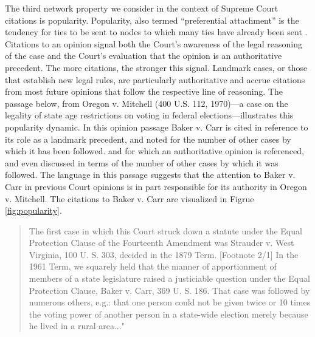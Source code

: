 \documentclass[headsepline=true, abstracton]{scrartcl}
\begin{document}
The third network property we consider in the context of Supreme Court citations is popularity. Popularity, also termed ``preferential attachment'' is the tendency for ties to be sent to nodes to which many ties have already been sent \citep{barabasi1999emergence}. Citations to an opinion signal both the Court's awareness of the legal reasoning of the case and the Court's evaluation that the opinion is an authoritative precedent. The more citations, the stronger this signal. Landmark cases, or those that establish new legal rules, are particularly authoritative and accrue citations from most future opinions that follow the respective line of reasoning. The passage below, from Oregon v. Mitchell (400 U.S. 112, 1970)---a case on the legality of state age restrictions on voting in federal elections---illustrates this popularity dynamic. In this opinion passage Baker v. Carr is cited in reference to its role as a landmark precedent, and noted for the number of other cases by which it has been followed. and for which an authoritative opinion is referenced, and even discussed in terms of the number of other cases by which it was followed. The language in this passage suggests that the attention to Baker v. Carr in previous Court opinions is in part responsible for its authority in Oregon v. Mitchell. The citations to Baker v. Carr are visualized in Figrue \ref{fig:popularity}.
\begin{quotation}
The first case in which this Court struck down a statute under the Equal Protection Clause of the Fourteenth Amendment was Strauder v. West Virginia, 100 U. S. 303, decided in the 1879 Term. [Footnote 2/1] In the 1961 Term, we squarely held that the manner of apportionment of members of a state legislature raised a justiciable question under the Equal Protection Clause, Baker v. Carr, 369 U. S. 186. That case was followed by numerous others, e.g.: that one person could not be given twice or 10 times the voting power of another person in a state-wide election merely because he lived in a rural area..."
\end{quotation} %
\end{document}
